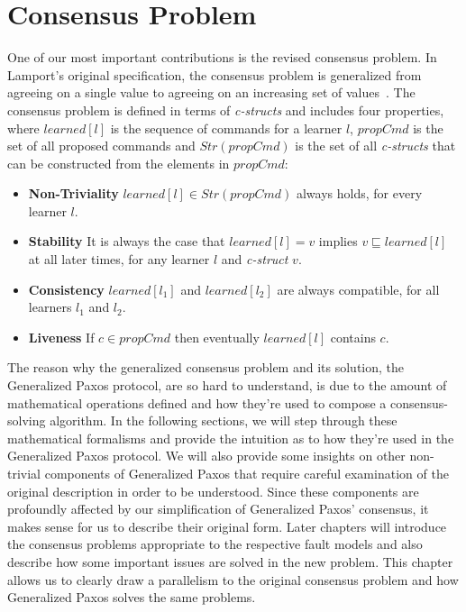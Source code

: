 \chapter{Consensus Problem} \label{problem}

One of our most important contributions is the revised consensus problem. In Lamport's original specification, the consensus problem is generalized from agreeing on a single value to agreeing on an increasing set of values~\cite{Lamport2005}. The consensus problem is defined in terms of \textit{c-structs} and includes four properties, where $learned[l]$ is the sequence of commands for a learner $l$, $propCmd$ is the set of all proposed commands and $Str(propCmd)$ is the set of all \textit{c-structs} that can be constructed from the elements in $propCmd$:
\begin{itemize}
	\item \textbf{Non-Triviality} $learned[l] \in Str(propCmd)$ always holds, for every learner $l$.
	\item \textbf{Stability} It is always the case that $learned[l] = v$ implies $v \sqsubseteq learned[l]$ at all later times, for any learner $l$ and \textit{c-struct} $v$.
	\item \textbf{Consistency} $learned[l_1]$ and $learned[l_2]$ are always compatible, for all learners $l_1$ and $l_2$.
	\item \textbf{Liveness} If $c \in propCmd$ then eventually $learned[l]$ contains $c$.
\end{itemize}

\par
The reason why the generalized consensus problem and its solution, the Generalized Paxos protocol, are so hard to understand, is due to the amount of mathematical operations defined and how they're used to compose a consensus-solving algorithm. In the following sections, we will step through these mathematical formalisms and provide the intuition as to how they're used in the Generalized Paxos protocol. {\color{red}We will also provide some insights on other non-trivial components of Generalized Paxos that require careful examination of the original description in order to be understood. Since these components are profoundly affected by our simplification of Generalized Paxos' consensus, it makes sense for us to describe their original form. Later chapters will introduce the consensus problems appropriate to the respective fault models and also describe how some important issues are solved in the new problem. This chapter allows us to clearly draw a parallelism to the original consensus problem and how Generalized Paxos solves the same problems.}

